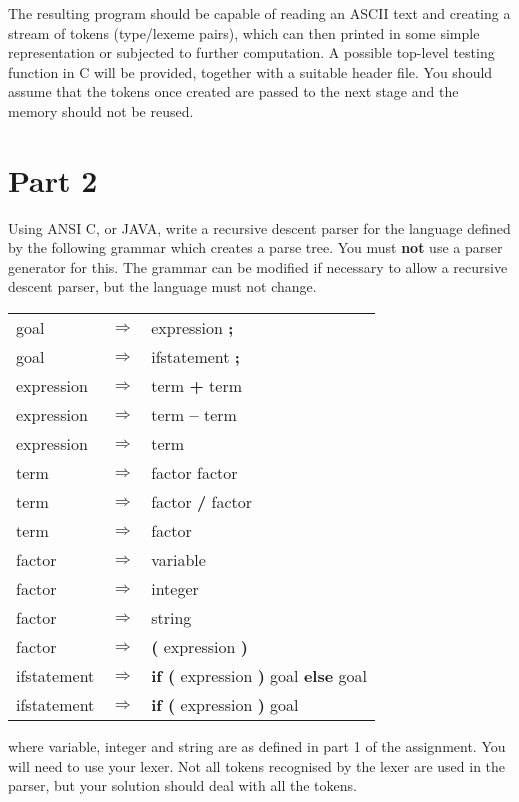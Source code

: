 \noindent The resulting program should be capable of reading an ASCII text and
creating a stream of tokens (type/lexeme pairs), which can then
printed in some simple representation or subjected to further
computation.  A possible top-level testing function in C will be provided,
together with a suitable header file.  You should assume that the
tokens once created are passed to the next stage and the memory should
not be reused.

\section*{Part 2}

Using ANSI C, or JAVA, write a recursive descent parser for the
language defined by the following grammar which creates a parse tree.
You must {\bf not} use a parser generator for this.  The grammar can be
modified if necessary to allow a recursive descent parser, but the
language must not change.

\begin{tabular}{lcl}
goal & $\Rightarrow$ & expression {\bf ;} \\
goal & $\Rightarrow$ & ifstatement {\bf ;} \\
expression & $\Rightarrow$ & term {\bf +} term \\
expression & $\Rightarrow$ & term {\bf --} term \\
expression & $\Rightarrow$ & term \\
term & $\Rightarrow$ & factor {\bf *} factor \\
term & $\Rightarrow$ & factor {\bf /} factor \\
term & $\Rightarrow$ & factor \\
factor & $\Rightarrow$ & variable \\
factor & $\Rightarrow$ & integer \\
factor & $\Rightarrow$ & string \\
factor & $\Rightarrow$ & {\bf (} expression {\bf )} \\
ifstatement & $\Rightarrow$ & {\bf if (} expression  {\bf )} goal {\bf else} goal\\
ifstatement & $\Rightarrow$ & {\bf if (} expression  {\bf )} goal
\end{tabular}

\noindent
where variable, integer and string are as defined in part 1 of the
assignment.  You will need to use your lexer.  Not all tokens
recognised by the lexer are used in the parser, but your solution
should deal with all the tokens.

